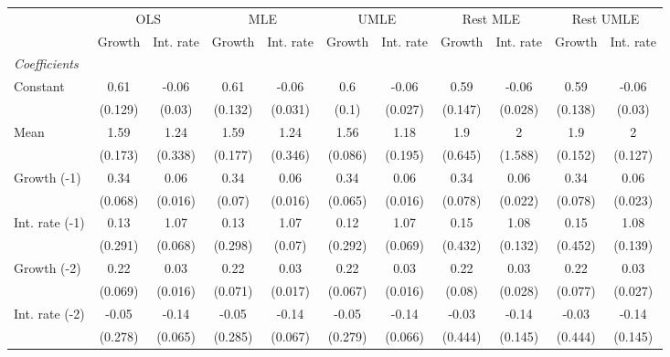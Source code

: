 \begin{table}[htbp] 
	\centering 
	\begin{tabular}{@{\extracolsep{4pt}}lcccccccccc@{}}		\hline\hline
		 		 & \multicolumn{2}{c}{OLS} &\multicolumn{2}{c}{MLE} &\multicolumn{2}{c}{UMLE} &\multicolumn{2}{c}{Rest MLE} &\multicolumn{2}{c}{Rest UMLE} \\ 
 		 & Growth 	 & Int. rate 	 & Growth 	 & Int. rate 	 & Growth 	 & Int. rate 	 & Growth 	 & Int. rate 	 & Growth 	 & Int. rate\\\cline{2-3}\cline{4-5}\cline{6-7}\cline{8-9}\cline{10-11}
\rule{0pt}{4ex} 
 \emph{Coefficients} 	  		 & 		 & 		 & 		 & 		 & 		 & 		 & 		 & 		 & 		 &\\ 
\quad Constant 	 & 0.61 	 & -0.06 	 & 0.61 	 & -0.06 	 & 0.6 	 & -0.06 	 & 0.59 	 & -0.06 	 & 0.59 	 & -0.06	 \\ 
 		 & (0.129) 	 & (0.03) 	 & (0.132) 	 & (0.031) 	 & (0.1) 	 & (0.027) 	 & (0.147) 	 & (0.028) 	 & (0.138) 	 & (0.03) 	 \\ 
\quad Mean 	 & 1.59 	 & 1.24 	 & 1.59 	 & 1.24 	 & 1.56 	 & 1.18 	 & 1.9 	 & 2 	 & 1.9 	 & 2	 \\ 
 		 & (0.173) 	 & (0.338) 	 & (0.177) 	 & (0.346) 	 & (0.086) 	 & (0.195) 	 & (0.645) 	 & (1.588) 	 & (0.152) 	 & (0.127) 	 \\ 
\quad Growth (-1) 	 &0.34 	 & 0.06 	 & 0.34 	 & 0.06 	 & 0.34 	 & 0.06 	 & 0.34 	 & 0.06 	 & 0.34 	 & 0.06	 \\ 
 		 & (0.068) 	 & (0.016) 	 & (0.07) 	 & (0.016) 	 & (0.065) 	 & (0.016) 	 & (0.078) 	 & (0.022) 	 & (0.078) 	 & (0.023) 	 \\ 
\quad Int. rate (-1) 	 &0.13 	 & 1.07 	 & 0.13 	 & 1.07 	 & 0.12 	 & 1.07 	 & 0.15 	 & 1.08 	 & 0.15 	 & 1.08	 \\ 
 		 & (0.291) 	 & (0.068) 	 & (0.298) 	 & (0.07) 	 & (0.292) 	 & (0.069) 	 & (0.432) 	 & (0.132) 	 & (0.452) 	 & (0.139) 	 \\ 
\quad Growth (-2) 	 &0.22 	 & 0.03 	 & 0.22 	 & 0.03 	 & 0.22 	 & 0.03 	 & 0.22 	 & 0.03 	 & 0.22 	 & 0.03	 \\ 
 		 & (0.069) 	 & (0.016) 	 & (0.071) 	 & (0.017) 	 & (0.067) 	 & (0.016) 	 & (0.08) 	 & (0.028) 	 & (0.077) 	 & (0.027) 	 \\ 
\quad Int. rate (-2) 	 &-0.05 	 & -0.14 	 & -0.05 	 & -0.14 	 & -0.05 	 & -0.14 	 & -0.03 	 & -0.14 	 & -0.03 	 & -0.14	 \\ 
 		 & (0.278) 	 & (0.065) 	 & (0.285) 	 & (0.067) 	 & (0.279) 	 & (0.066) 	 & (0.444) 	 & (0.145) 	 & (0.444) 	 & (0.145) 	 \\ 

\end{tabular}
\end{table}

